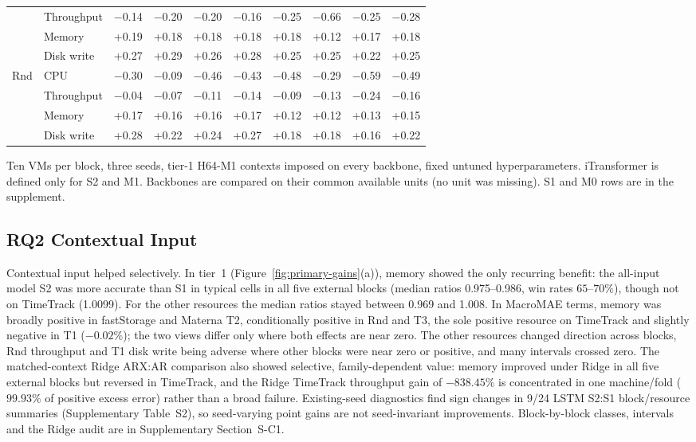 \documentclass[5p,twocolumn]{elsarticle}
\begin{document}
\begin{table}[t]
\begin{tabular*}{\textwidth}{@{\extracolsep{\fill}}llrrrrrrrr@{}}
     & Throughput & $-$0.14 & $-$0.20 & $-$0.20 & $-$0.16 & $-$0.25 & $-$0.66 & $-$0.25 & $-$0.28 \\
     & Memory & +0.19 & +0.18 & +0.18 & +0.18 & +0.18 & +0.12 & +0.17 & +0.18 \\
     & Disk write & +0.27 & +0.29 & +0.26 & +0.28 & +0.25 & +0.25 & +0.22 & +0.25 \\
    Rnd & CPU & $-$0.30 & $-$0.09 & $-$0.46 & $-$0.43 & $-$0.48 & $-$0.29 & $-$0.59 & $-$0.49 \\
     & Throughput & $-$0.04 & $-$0.07 & $-$0.11 & $-$0.14 & $-$0.09 & $-$0.13 & $-$0.24 & $-$0.16 \\
     & Memory & +0.17 & +0.16 & +0.16 & +0.17 & +0.12 & +0.12 & +0.13 & +0.15 \\
     & Disk write & +0.28 & +0.22 & +0.24 & +0.27 & +0.18 & +0.18 & +0.16 & +0.22 \\
    \bottomrule
  \end{tabular*}

  \vspace{2pt}
  \parbox{\textwidth}{\footnotesize Ten VMs per block, three seeds, tier-1 H64-M1 contexts imposed on every backbone, fixed untuned hyperparameters. iTransformer is defined only for S2 and M1. Backbones are compared on their common available units (no unit was missing). S1 and M0 rows are in the supplement.}
\end{table}


\subsection{RQ2 Contextual Input}
\label{sec:results-rq1}

Contextual input helped selectively. In tier~1
(Figure~\ref{fig:primary-gains}(a)), memory showed the only recurring
benefit: the all-input model S2 was more accurate than S1 in typical cells in
all five external blocks (median ratios 0.975--0.986, win rates
$65$--$70\%$), though not on TimeTrack (1.0099). For the other resources the
median ratios stayed between 0.969 and 1.008. In MacroMAE terms, memory was
broadly positive in fastStorage and Materna T2, conditionally positive in Rnd
and T3, the sole positive resource on TimeTrack and slightly negative in T1
($-0.02\%$); the two views differ only where both effects are near zero. The
other resources changed direction across blocks, Rnd throughput and T1 disk
write being adverse where other blocks were near zero or positive, and many
intervals crossed zero. The matched-context Ridge
ARX:AR comparison also showed selective, family-dependent value: memory
improved under Ridge in all five external blocks but reversed in TimeTrack,
and the Ridge TimeTrack throughput gain of $-838.45\%$ is concentrated in one
machine/fold ($99.93\%$ of positive excess error) rather than a broad
failure. Existing-seed diagnostics find sign changes in 9/24 LSTM S2:S1
block/resource summaries (Supplementary Table~S2), so seed-varying point gains
are not seed-invariant improvements. Block-by-block classes, intervals and the
Ridge audit are in Supplementary Section~S-C1.
\end{document}
